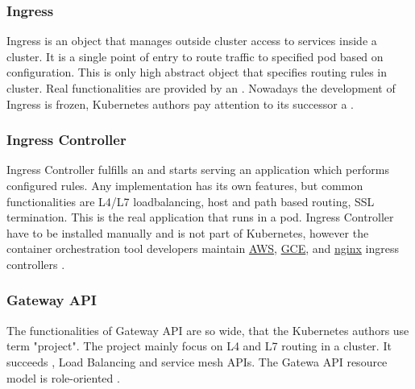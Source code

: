 \subsubsection{Ingress}
\label{ingress}

Ingress is an object that manages outside cluster access to services inside a cluster. It is a single point of entry to route traffic to specified pod based on configuration. This is only high abstract object that specifies routing rules in cluster. Real functionalities are provided by an \textit{}. Nowadays the development of Ingress is frozen, Kubernetes authors pay attention to its successor a \textit{} \cite{KubernetesIngress}.

\subsubsection{Ingress Controller}
\label{ingresscontroller}

Ingress Controller fulfills an \textit{} and starts serving an application which performs configured rules. Any implementation has its own features, but common functionalities are L4/L7 loadbalancing, host and path based routing, SSL termination. This is the real application that runs in a pod. Ingress Controller have to be installed manually and is not part of Kubernetes, however the container orchestration tool developers maintain \href{https://github.com/kubernetes-sigs/aws-load-balancer-controller#readme}{AWS}, \href{https://github.com/kubernetes/ingress-gce/blob/master/README.md#readme}{GCE}, and \href{https://github.com/kubernetes/ingress-nginx/blob/main/README.md#readme}{nginx} ingress controllers \cite{KubernetesIngress}\cite{KubernetesIngressControllers}.

\subsubsection{Gateway API}
\label{gatewayapi}

The functionalities of Gateway API are so wide, that the Kubernetes authors use term "project". The project mainly focus on L4 and L7 routing in a cluster. It succeeds \textit{}, Load Balancing and service mesh APIs. The Gatewa API resource model is role-oriented \cite{KubernetesGatewayAPI}.

